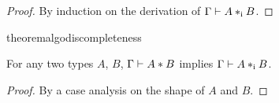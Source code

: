 \begin{proof}
  By induction on the derivation of $\Gamma \vdash A *_\textnormal{i} B$.
\end{proof}

\begin{restatable}{theorem}{algodiscompleteness}
  \label{theorem:completeness}

  For any two types $A$, $B$, $\Gamma \vdash A * B$ implies $\Gamma \vdash A *_\textnormal{i} B$.
\end{restatable}

\begin{proof}
  By a case analysis on the shape of $A$ and $B$.
\end{proof}
